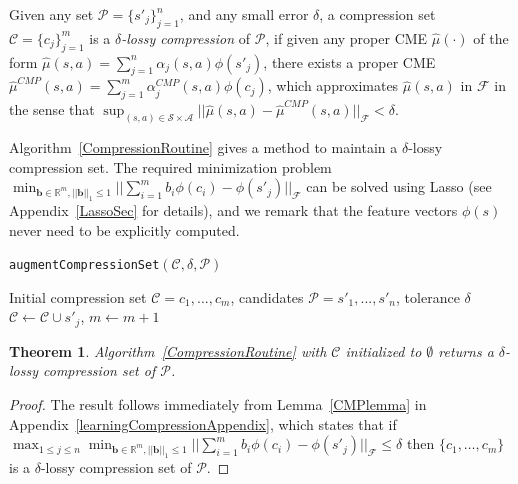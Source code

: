 \documentclass[letterpaper]{article}
\newtheorem{theorem}{Theorem}[section]
\newenvironment{definition}[1][Definition]{\begin{trivlist}
\item[\hskip \labelsep {\bfseries #1}]}{\end{trivlist}}
\newcommand{\cC}{{\mathcal C}}
\newcommand{\cF}{{\mathcal F}}
\newcommand{\cA}{{\mathcal A}}
\newcommand{\cS}{{\mathcal S}}
\newcommand{\cP}{{\mathcal P}}
\newcommand{\R}{{\mathbb R}}
\begin{document}
\begin{definition} \label{lossyCompression}
Given any set $\cP = \{s'_j\}_{j=1}^n$, and any small error $\delta$, a compression set $\cC=\{c_j\}_{j=1}^m$ is a \emph{$\delta$-lossy compression} of $\cP$, if given any proper CME $\hat\mu(\cdot)$ of the form $\hat\mu(s,a) = \sum_{j=1}^n \alpha_j(s,a) \phi(s'_j)$, there exists a proper CME $\hat\mu^{CMP}(s,a) = \sum_{j=1}^m \alpha^{CMP}_j(s,a) \phi(c_j)$, which approximates $\hat\mu(s,a)$ in $\cF$ in the sense that $\sup_{(s,a)\in\cS\times\cA}||\hat\mu(s,a) - \hat\mu^{CMP}(s,a)||_\cF < \delta$.
\end{definition}

Algorithm~\ref{CompressionRoutine} gives a method to maintain a $\delta$-lossy compression set. The required minimization problem $\min_{{\bm b}\in\R^m , ||{\bm b}||_1\le 1} ||\sum_{i=1}^m b_i \phi(c_i) - \phi(s'_j)||_{\cF}$ can be solved using Lasso (see Appendix~\ref{LassoSec} for details), and we remark that the feature vectors $\phi(s)$ never need to be explicitly computed.

\begin{algorithm}[htb]
   \caption{\texttt{augmentCompressionSet}$(\cC,\delta,\cP)$}
   \label{CompressionRoutine}
\begin{algorithmic}
     Initial compression set $\cC = {c_1,...,c_m}$, candidates $\cP = {s'_1,...,s'_n}$, tolerance $\delta$
	 \IF {$\min_{{\bm b}\in\R^m , ||{\bm b}||_1\le 1}\hspace{-0.6mm} ||\sum_{i=1}^m b_i \phi(c_i) \hspace{-0.6mm}-\hspace{-0.6mm} \phi(s'_j)||_{\cF} \hspace{-0.6mm}>\hspace{-0.6mm} \delta$}
	  $\cC \leftarrow \cC \cup s'_j$, $m\leftarrow m+1$
   \ENDIF
	\ENDFOR
\end{algorithmic}
\end{algorithm}

\begin{theorem} \label{CompressionTheorem}
Algorithm~\ref{CompressionRoutine} with $\cC$ initialized to $\emptyset$ returns a $\delta$-lossy compression set of $\cP$.
\end{theorem}
\begin{proof} The result follows immediately from Lemma~\ref{CMPlemma} in Appendix~\ref{learningCompressionAppendix},
which states that if $\max_{1\le j \le n } \min_{{\bm b}\in\R^m , ||{\bm b}||_1\le 1}
 ||\sum_{i=1}^m b_i \phi(c_i)-\phi(s'_j)||_{\cF}\le \delta$ then $\{c_1,\dots,c_m\}$ is a $\delta$-lossy compression set of $\cP$.
\end{proof}
\end{document}
